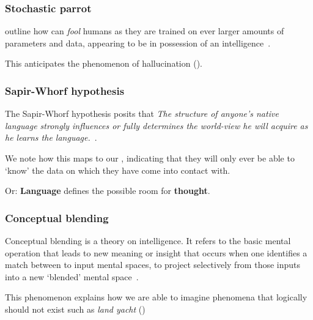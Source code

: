 \subsubsection{Stochastic parrot}\label{sec:llmParrot}

\citeauthor{parrot} outline how  can \textit{fool} humans as they
are trained on ever larger amounts of parameters and data, appearing to be in possession of an
intelligence~\cite[610-611]{parrot}.

This anticipates the phenomenon of hallucination ().

\subsubsection{Sapir-Whorf hypothesis}

The Sapir-Whorf hypothesis posits that  \textit{The structure of anyone’s native
    language strongly influences or fully determines the world-view he will acquire
    as he learns the language.}~\cite[128]{sapirWhorf}.

We note how this maps to our , indicating that they will only ever
be able to `know' the data on which they have come into contact with.

Or: \textbf{Language} defines the possible room for \textbf{thought}.


\subsubsection{Conceptual blending}

Conceptual blending is a theory on intelligence. It refers to the basic mental
operation that leads to new meaning or insight that occurs when one identifies
a match between to input mental spaces, to project selectively from those inputs
into a new `blended' mental space~\cite[57-58]{conceptBlending}.

This phenomenon explains how we are able to imagine phenomena that logically
should not exist such as \textit{land yacht} ()

